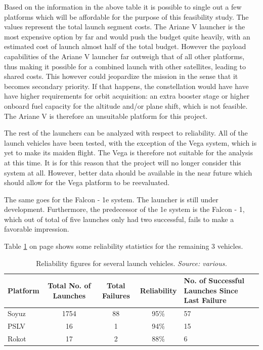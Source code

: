 Based on the information  in the above table it is possible to single out a few platforms which will be affordable for the purpose of this feasibility study. The values represent the total launch segment costs. The Ariane V launcher is the most expensive option by far and would push the budget quite heavily, with an estimated cost of launch almost half of the total budget. However the payload capabilities of the Ariane V launcher far outweigh that of all other platforms, thus making it possible for a combined launch with other satellites, leading to shared costs. This however could jeopardize the mission in the sense that it becomes secondary priority. If that happens, the constellation would have have have higher requirements for orbit acquisition: an extra booster stage or higher onboard fuel capacity for the altitude and/or plane shift, which is not feasible. The Ariane V is therefore an unsuitable platform for this project. 

The rest of the launchers can be analyzed with respect to reliability. All of the launch vehicles have been tested, with the exception of the Vega system, which is yet to make its maiden flight. The Vega is therefore not suitable for the analysis at this time. It is for this reason that the project will no longer consider this system at all.  However, better data should be available in the near future which should allow for the Vega platform to be reevaluated.

The same goes for the Falcon - 1e system. The launcher is still under development. Furthermore, the predecessor of the 1e system is the Falcon - 1, which out of total of five launches only had two successful, fails to make a favorable impression. 

Table \ref{table:LVreliability} on page \pageref{table:LVreliability} shows some reliability statistics for the remaining 3 vehicles.

\begin{table}[h]
\begin{centering}
\begin{tabular}{lcccp{5cm}}
\toprule
Platform & Total No. of Launches & Total Failures & Reliability & No. of Successful Launches Since Last Failure  \\
\hline \hline
Soyuz   & 1754  &  88 & 95\% & 57 \\
PSLV & 16 & 1 & 94\% & 15 \\
Rokot & 17& 2 & 88\% & 6 \\
\bottomrule
\end{tabular}
\caption{Reliability figures for several launch vehicles. \emph{Source: various.} }
\label{table:LVreliability}
\end{centering}
\end{table}

